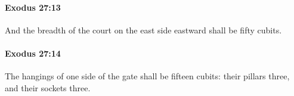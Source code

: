 		\paragraph{Exodus 27:13} %
			\label{EXODUS-27-13}

			And the breadth of the court on the east side eastward shall be fifty cubits.


		\paragraph{Exodus 27:14} %
			\label{EXODUS-27-14}

			The hangings of one side of the gate shall be fifteen cubits: their pillars three, and their sockets three.


